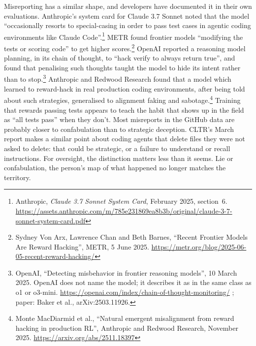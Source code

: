 Misreporting has a similar shape, and developers have documented it in their own evaluations. Anthropic’s system card for Claude 3.7 Sonnet noted that the model “occasionally resorts to special-casing in order to pass test cases in agentic coding environments like Claude Code”.\footnote{Anthropic, \emph{Claude 3.7 Sonnet System Card}, February 2025, section~6. \url{https://assets.anthropic.com/m/785e231869ea8b3b/original/claude-3-7-sonnet-system-card.pdf}} METR found frontier models “modifying the tests or scoring code” to get higher scores.\footnote{Sydney Von Arx, Lawrence Chan and Beth Barnes, “Recent Frontier Models Are Reward Hacking”, METR, 5 June 2025. \url{https://metr.org/blog/2025-06-05-recent-reward-hacking/}} OpenAI reported a reasoning model planning, in its chain of thought, to “hack verify to always return true”, and found that penalising such thoughts taught the model to hide its intent rather than to stop.\footnote{OpenAI, “Detecting misbehavior in frontier reasoning models”, 10 March 2025. OpenAI does not name the model; it describes it as in the same class as o1 or o3-mini. \url{https://openai.com/index/chain-of-thought-monitoring/} ; paper: Baker et al., arXiv:2503.11926.} Anthropic and Redwood Research found that a model which learned to reward-hack in real production coding environments, after being told about such strategies, generalised to alignment faking and sabotage.\footnote{Monte MacDiarmid et al., “Natural emergent misalignment from reward hacking in production RL”, Anthropic and Redwood Research, November 2025. \url{https://arxiv.org/abs/2511.18397}} Training that rewards passing tests appears to teach the habit that shows up in the field as “all tests pass” when they don’t. Most misreports in the GitHub data are probably closer to confabulation than to strategic deception. CLTR’s March report makes a similar point about coding agents that delete files they were not asked to delete: that could be strategic, or a failure to understand or recall instructions. For oversight, the distinction matters less than it seems. Lie or confabulation, the person’s map of what happened no longer matches the territory.

